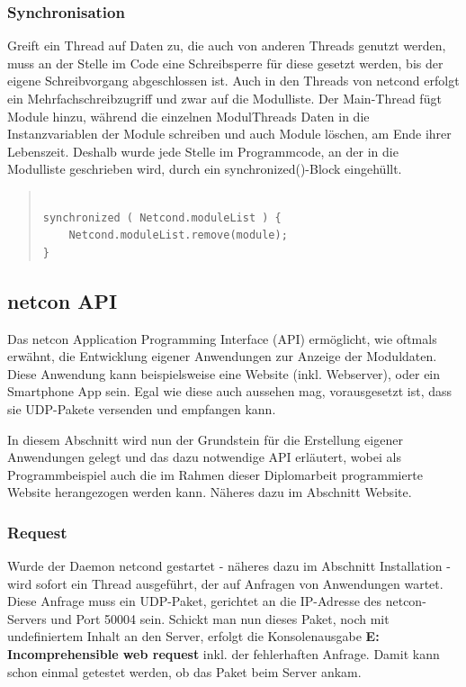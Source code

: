 \documentclass[a4paper,14pt,headsepline]{scrartcl}
\begin{document}
\newpage

\subsubsection*{Synchronisation}

Greift ein Thread auf Daten zu, die auch von anderen Threads genutzt werden, muss an der Stelle im Code eine Schreibsperre für diese gesetzt werden, bis der eigene Schreibvorgang abgeschlossen ist. Auch in den Threads von netcond erfolgt ein Mehrfachschreibzugriff und zwar auf die Modulliste. Der Main-Thread fügt Module hinzu, während die einzelnen ModulThreads Daten in die Instanzvariablen der Module schreiben und auch Module löschen, am Ende ihrer Lebenszeit. Deshalb wurde jede Stelle im Programmcode, an der in die Modulliste geschrieben wird, durch ein synchronized()-Block eingehüllt.    
					
\begin{quote}
\begin{verbatim}

synchronized ( Netcond.moduleList ) {
    Netcond.moduleList.remove(module);
}

\end{verbatim}
\end{quote} 

\newpage

\subsection{netcon API}

Das netcon Application Programming Interface (API) ermöglicht, wie oftmals erwähnt, die Entwicklung eigener Anwendungen zur Anzeige der Moduldaten. Diese Anwendung kann beispielsweise eine Website (inkl. Webserver), oder ein Smartphone App sein. Egal wie diese auch aussehen mag, vorausgesetzt ist, dass sie UDP-Pakete versenden und empfangen kann. 

In diesem Abschnitt wird nun der Grundstein für die Erstellung eigener Anwendungen gelegt und das dazu notwendige API erläutert, wobei als Programmbeispiel auch die im Rahmen dieser Diplomarbeit programmierte Website herangezogen werden kann. Näheres dazu im Abschnitt Website. 

\subsubsection*{Request}
Wurde der Daemon netcond gestartet - näheres dazu im Abschnitt Installation - wird sofort ein Thread ausgeführt, der auf Anfragen von Anwendungen wartet. Diese Anfrage muss ein UDP-Paket, gerichtet an die IP-Adresse des netcon-Servers und Port 50004 sein. Schickt man nun dieses Paket, noch mit undefiniertem Inhalt an den Server, erfolgt die Konsolenausgabe \textbf{E: Incomprehensible web request} inkl. der fehlerhaften Anfrage. Damit kann schon einmal getestet werden, ob das Paket beim Server ankam. 
\end{document}
